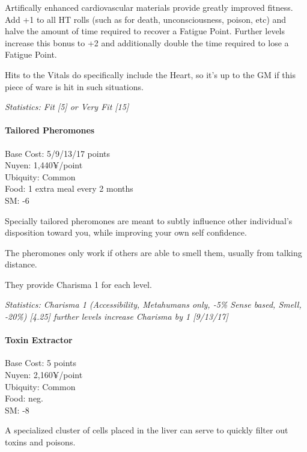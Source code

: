 \begin{multicols*}{3}
	Artifically enhanced cardiovascular materials provide greatly improved fitness. Add +1 to all HT rolls (such as for death, unconsciousness, poison, etc) and halve the amount of time required to recover a Fatigue Point. Further levels increase this bonus to +2 and additionally double the time required to lose a Fatigue Point.
	
	Hits to the Vitals do specifically include the Heart, so it's up to the GM if this piece of ware is hit in such situations.
	
	\textit{\textcolor{OliveGreen}{Statistics: Fit [5] or Very Fit [15]}}
	
	\paragraph{Tailored Pheromones}
	\begin{flushright}
		Base Cost: 5/9/13/17 points\\
		Nuyen: 1,440¥/point\\
		Ubiquity: Common\\
		Food: 1 extra meal every 2 months\\
		SM: -6\\
	\end{flushright}
	
	Specially tailored pheromones are meant to subtly influence other individual's disposition toward you, while improving your own self confidence. 
	
	The pheromones only work if others are able to smell them, usually from talking distance. 
	
	They provide Charisma 1 for each level.
	
	\textit{\textcolor{OliveGreen}{Statistics: Charisma 1 (Accessibility, Metahumans only, -5\% Sense based, Smell, -20\%) [4.25] further levels increase Charisma by 1 [9/13/17]}}
	
	\paragraph{Toxin Extractor}
	\begin{flushright}
		Base Cost: 5 points\\
		Nuyen: 2,160¥/point\\
		Ubiquity: Common\\
		Food: neg.\\
		SM: -8\\
	\end{flushright}
	
	A specialized cluster of cells placed in the liver can serve to quickly filter out toxins and poisons.
	

\end{multicols*}
